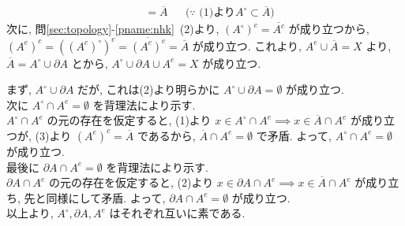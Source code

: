 \begin{nmprob}
{\begin{align*}
                            &= \overline{A}&&\text{($\because$ (1)より$A^\circ \subset \overline{A}$)} 
\end{align*}
次に, 問\ref{sec:topology}-\ref{pname:nhk}\ (2)より, $(A^\circ)^c = \overline{A^c}$ が成り立つから, $(A^e)^c = ((A^c)^\circ)^c = \overline{(A^c)^c} = \overline{A}$ が成り立つ. これより, $A^e \cup \overline{A} = X$ より, 
$\overline{A} = A^\circ \cup \partial A$ とから, $A^\circ \cup \partial A \cup A^e = X$ が成り立つ.
\item
まず, $A^\circ \cup \partial A$ だが, これは(2)より明らかに $A^\circ \cup \partial A = \emptyset$ が成り立つ.\\
次に $A^\circ \cap A^e = \emptyset$ を背理法により示す.\\
$A^\circ \cap A^e$ の元の存在を仮定すると, (1)より $x \in A^\circ \cap A^e \implies x \in \overline{A} \cap A^e$ が成り立つが, (3)より $(A^e)^c = \overline{A}$ であるから, $\overline{A} \cap A^e = \emptyset$
で矛盾. よって, $A^\circ \cap A^e = \emptyset$ が成り立つ.\\
最後に $\partial A \cap A^e = \emptyset$ を背理法により示す.\\
$\partial A \cap A^e$ の元の存在を仮定すると, (2)より $x \in \partial A \cap A^e \implies x \in \overline{A} \cap A^e$ が成り立ち, 先と同様にして矛盾. よって, $\partial A \cap A^e = \emptyset$ が成り立つ.\\
以上より, $A^\circ, \partial A, A^e$ はそれぞれ互いに素である.
}
\end{nmprob}
